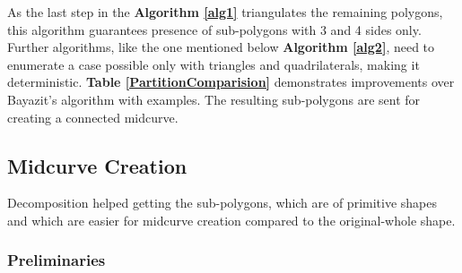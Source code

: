 As the last step in the {\bf Algorithm \ref{alg1}} triangulates the remaining polygons, this algorithm guarantees presence of sub-polygons with 3 and 4 sides only. Further algorithms, like the one mentioned below {\bf Algorithm \ref{alg2}}, need to enumerate a case possible only with triangles and quadrilaterals, making it deterministic. {\bf Table \ref{PartitionComparision}} demonstrates improvements over Bayazit's \citep{Bayazit} algorithm with examples.  The resulting sub-polygons are sent for creating a connected midcurve.


\subsection{Midcurve Creation}

Decomposition helped getting the sub-polygons, which are of primitive shapes and which are easier for midcurve creation compared to the original-whole shape. 


\subsubsection{Preliminaries }

